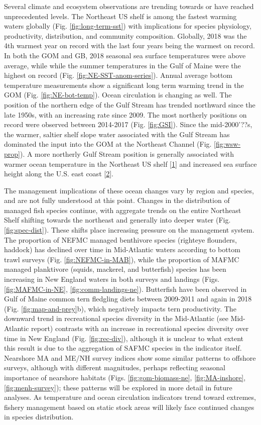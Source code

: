 \documentclass[10pt,]{article}
\begin{document}
Several climate and ecosystem observations are trending towards or have
reached unprecedented levels. The Northeast US shelf is among the
fastest warming waters globally (Fig. \ref{fig:long-term-sst}) with
implications for species physiology, productivity, distribution, and
community composition. Globally, 2018 was the 4th warmest year on record
with the last four years being the warmest on record. In both the GOM
and GB, 2018 seasonal sea surface temperatures were above average, while
while the summer temperatures in the Gulf of Maine were the highest on
record (Fig. \ref{fig:NE-SST-anom-series}). Annual average bottom
temperature measurements show a significant long term warming trend in
the GOM (Fig. \ref{fig:NE-bot-temp}). Ocean circulation is changing as
well. The position of the northern edge of the Gulf Stream has trended
northward since the late 1950s, with an increasing rate since 2009. The
most northerly positions on record were observed between 2014-2017 (Fig.
\ref{fig:GSI}). Since the mid-2000'??s, the warmer, saltier shelf slope
water associated with the Gulf Stream has dominated the input into the
GOM at the Northeast Channel (Fig. \ref{fig:wsw-prop}). A more northerly
Gulf Stream position is generally associated with warmer ocean
temperature in the Northeast US shelf
{[}\protect\hyperlink{ref-zhang_role_2007}{1}{]} and increased sea
surface height along the U.S. east coast
{[}\protect\hyperlink{ref-goddard_extreme_2015}{2}{]}.

The management implications of these ocean changes vary by region and
species, and are not fully understood at this point. Changes in the
distribution of managed fish species continue, with aggregate trends on
the entire Northeast Shelf shifting towards the northeast and generally
into deeper water (Fig. \ref{fig:spec-dist}). These shifts place
increasing pressure on the management system. The proportion of NEFMC
managed benthivore species (righteye flounders, haddock) has declined
over time in Mid-Atlantic waters according to bottom trawl surveys (Fig.
\ref{fig:NEFMC-in-MAB}), while the proportion of MAFMC managed
planktivore (squids, mackerel, and butterfish) species has been
increasing in New England waters in both surveys and landings (Figs.
\ref{fig:MAFMC-in-NE}, \ref{fig:comm-landings-ne}). Butterfish have been
observed in Gulf of Maine common tern fledgling diets between 2009-2011
and again in 2018 (Fig. \ref{fig:map-and-prey}b), which negatively
impacts tern productivity. The downward trend in recreational species
diversity in the Mid-Atlantic (see Mid-Atlantic report) contrasts with
an increase in recreational species diversity over time in New England
(Fig. \ref{fig:rec-div}), although it is unclear to what extent this
result is due to the aggregation of SAFMC species in the indicator
itself. Nearshore MA and ME/NH survey indices show some similar patterns
to offshore surveys, although with different magnitudes, perhaps
reflecting seasonal importance of nearshore habitats (Figs.
\ref{fig:gom-biomass-ne}, \ref{fig:MA-inshore}, \ref{fig:menh-survey});
these patterns will be explored in more detail in future analyses. As
temperature and ocean circulation indicators trend toward extremes,
fishery management based on static stock areas will likely face
continued changes in species distribution.
\end{document}
